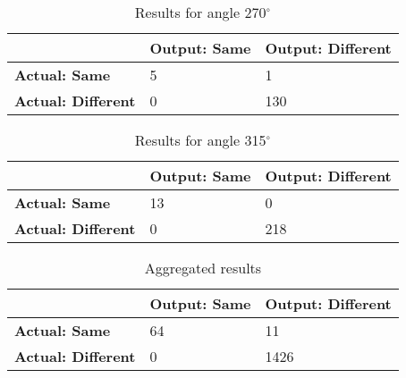 \begin{table}[H]
    \centering
	\begin{spacing}{1.5}    
    \begin{tabular}{|l|l|l|}
        \hline
        \cellcolor{gray} & \textbf{Output: Same} & \textbf{Output: Different} \\ [0.5ex]
        \hline\hline
        \textbf{Actual: Same} & 5 & 1 \\ [0.5ex]
        \hline
        \textbf{Actual: Different} & 0 & 130 \\ [0.5ex]
        \hline
    \end{tabular}
    \end{spacing}
    \caption{Results for angle 270$^{\circ}$}
\end{table}
            
\begin{table}[H]
    \centering
	\begin{spacing}{1.5}    
    \begin{tabular}{|l|l|l|}
        \hline
        \cellcolor{gray} & \textbf{Output: Same} & \textbf{Output: Different} \\ [0.5ex]
        \hline\hline
        \textbf{Actual: Same} & 13 & 0 \\ [0.5ex]
        \hline
        \textbf{Actual: Different} & 0 & 218 \\ [0.5ex]
        \hline
    \end{tabular}
    \end{spacing}
    \caption{Results for angle 315$^{\circ}$}
\end{table}
            
\begin{table}[H]
    \centering
	\begin{spacing}{1.5}
    \begin{tabular}{|l|l|l|}
        \hline
        \cellcolor{gray} & \textbf{Output: Same} & \textbf{Output: Different} \\ [0.5ex]
        \hline\hline
        \textbf{Actual: Same} & 64 & 11 \\ [0.5ex]
        \hline
        \textbf{Actual: Different} & 0 & 1426 \\ [0.5ex]
        \hline
    \end{tabular}
    \end{spacing}
    \caption{Aggregated results}
\end{table}
        
